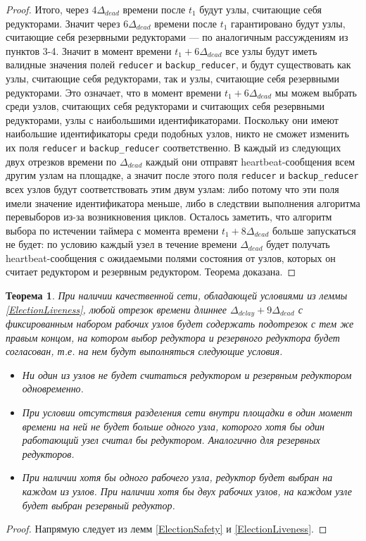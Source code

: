 \documentclass{article}
\theoremstyle{plain}
\newtheorem{theorem}{Теорема}[section]
\theoremstyle{plain}
\theoremstyle{plain}
\theoremstyle{plain}
\theoremstyle{definition}
\theoremstyle{remark}
\theoremstyle{plain}
\begin{document}
\begin{proof}
    Итого, через $4\Delta_{dead}$ времени после $t_1$ будут узлы, считающие себя редукторами. Значит через $6\Delta_{dead}$ времени после $t_1$ гарантировано будут узлы, считающие себя резервными редукторами --- по аналогичным рассуждениям из пунктов 3-4. Значит в момент времени $t_1 + 6\Delta_{dead}$ все узлы будут иметь валидные значения полей \texttt{reducer} и \texttt{backup\_reducer}, и будут существовать как узлы, считающие себя редукторами, так и узлы, считающие себя резервными редукторами. Это означает, что в момент времени $t_1 + 6\Delta_{dead}$ мы можем выбрать среди узлов, считающих себя редукторами и считающих себя резервными редукторами, узлы с наибольшими идентификаторами. Поскольку они имеют наибольшие идентификаторы среди подобных узлов, никто не сможет изменить их поля \texttt{reducer} и \texttt{backup\_reducer} соответственно. В каждый из следующих двух отрезков времени по $\Delta_{dead}$ каждый они отправят heartbeat-сообщения всем другим узлам на площадке, а значит после этого поля \texttt{reducer} и \texttt{backup\_reducer} всех узлов будут соответствовать этим двум узлам: либо потому что эти поля имели значение идентификатора меньше, либо в следствии выполнения алгоритма перевыборов из-за возникновения циклов. Осталось заметить, что алгоритм выбора по истечении таймера с момента времени $t_1 + 8\Delta_{dead}$ больше запускаться не будет: по условию каждый узел в течение времени $\Delta_{dead}$ будет получать heartbeat-сообщения с ожидаемыми полями состояния от узлов, которых он считает редуктором и резервным редуктором. Теорема доказана.
\end{proof}

\begin{theorem}
\label{ElectionEC}
    При наличии качественной сети, обладающей условиями из леммы \ref{ElectionLiveness}, любой отрезок времени длиннее $\Delta_{delay} + 9\Delta_{dead}$ с фиксированным набором рабочих узлов будет содержать подотрезок с тем же правым концом, на котором выбор редуктора и резервного редуктора будет согласован, т.е. на нем будут выполняться следующие условия.
    
    \begin{itemize}
        \item Ни один из узлов не будет считаться редуктором и резервным редуктором одновременно.
    
        \item При условии отсутствия разделения сети внутри площадки в один момент времени на ней не будет больше одного узла, которого хотя бы один работающий узел считал бы редуктором. Аналогично для резервных редукторов.
        
        \item При наличии хотя бы одного рабочего узла, редуктор будет выбран на каждом из узлов. При наличии хотя бы двух рабочих узлов, на каждом узле будет выбран резервный редуктор.
    \end{itemize}
\end{theorem}
\begin{proof}
    Напрямую следует из лемм \ref{ElectionSafety} и \ref{ElectionLiveness}.
\end{proof}
\end{document}

